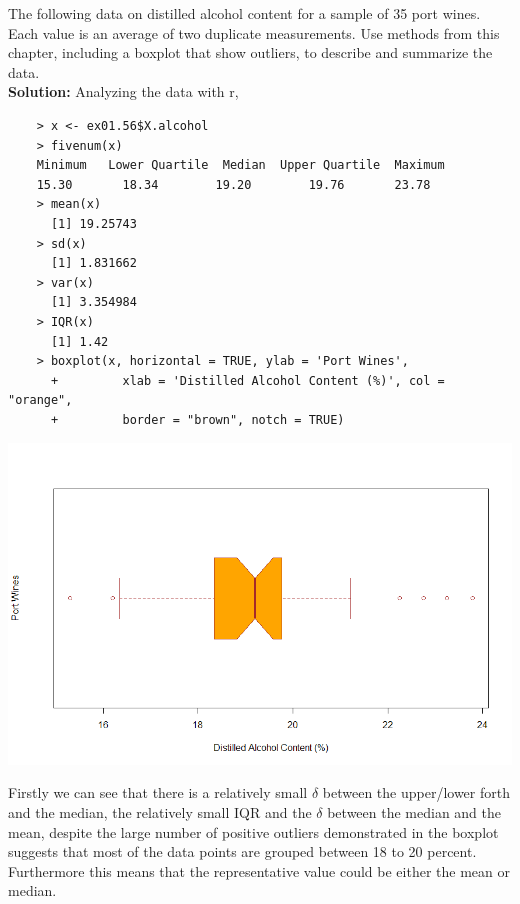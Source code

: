 \documentclass[12pt]{article}
\makeatletter
\theoremstyle{homework}
\newenvironment{exercise}[1]
{\def\@currentlabel{#1}\exercisecore}
{\endexercisecore}
\makeatother
\begin{document}
\begin{exercise}{1.56} The following data on distilled alcohol content for a sample of 35 port wines. Each value is an average of two duplicate measurements.
  Use methods from this chapter, including a boxplot that show outliers, to describe and summarize the data.\\

  \textbf{Solution:}
  Analyzing the data with r,
  \begin{lstlisting}
    > x <- ex01.56$X.alcohol
    > fivenum(x)
    Minimum   Lower Quartile  Median  Upper Quartile  Maximum 
    15.30       18.34        19.20        19.76       23.78 
    > mean(x)
      [1] 19.25743
    > sd(x)
      [1] 1.831662
    > var(x)
      [1] 3.354984
    > IQR(x)
      [1] 1.42
    > boxplot(x, horizontal = TRUE, ylab = 'Port Wines',
      +         xlab = 'Distilled Alcohol Content (%)', col = "orange",
      +         border = "brown", notch = TRUE)
  \end{lstlisting}
  \begin{center}
    \includegraphics[width=\textwidth]{Boxplot.png}      
  \end{center}
  Firstly we can see that there is a relatively small $\delta$ between the upper/lower forth and the median, the relatively small IQR and the $\delta$ between the median and the mean, 
  despite the large number of positive outliers demonstrated in the
  boxplot suggests that most of the data points are grouped between 18 to 20 percent. Furthermore this means that the representative value could be either the mean or median.






\end{exercise}
\vspace{1in}
\end{document}
